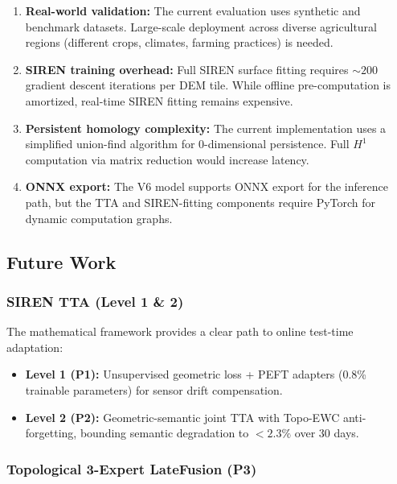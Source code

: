 \begin{enumerate}
    \item \textbf{Real-world validation:} The current evaluation uses synthetic
    and benchmark datasets. Large-scale deployment across diverse agricultural
    regions (different crops, climates, farming practices) is needed.

    \item \textbf{SIREN training overhead:} Full SIREN surface fitting requires
    $\sim200$ gradient descent iterations per DEM tile. While offline
    pre-computation is amortized, real-time SIREN fitting remains expensive.

    \item \textbf{Persistent homology complexity:} The current implementation
    uses a simplified union-find algorithm for 0-dimensional persistence.
    Full $H^1$ computation via matrix reduction would increase latency.

    \item \textbf{ONNX export:} The V6 model supports ONNX export for the
    inference path, but the TTA and SIREN-fitting components require
    PyTorch for dynamic computation graphs.
\end{enumerate}

\subsection{Future Work}

\subsubsection{SIREN TTA (Level 1 \& 2)}

The mathematical framework provides a clear path to online test-time adaptation:
\begin{itemize}
    \item \textbf{Level 1 (P1):} Unsupervised geometric loss + PEFT adapters
    (0.8\% trainable parameters) for sensor drift compensation.
    \item \textbf{Level 2 (P2):} Geometric-semantic joint TTA with Topo-EWC
    anti-forgetting, bounding semantic degradation to $<2.3\%$ over 30 days.
\end{itemize}

\subsubsection{Topological 3-Expert LateFusion (P3)}

